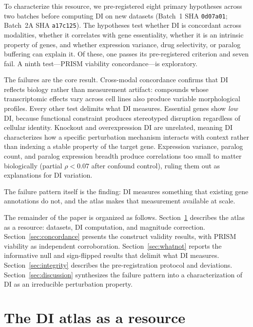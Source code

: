 \documentclass[11pt]{article}
\begin{document}
To characterize this resource, we pre-registered eight primary
hypotheses across two batches before computing DI on new datasets
(Batch~1 SHA \texttt{0d07a01}; Batch~2A SHA \texttt{a17c125}).  The
hypotheses test whether DI is concordant across modalities,
whether it correlates with gene essentiality, whether it is an
intrinsic property of genes, and whether expression variance,
drug selectivity, or paralog buffering can explain it.
Of these, one passes its pre-registered criterion and seven fail.  A
ninth test---PRISM viability concordance---is exploratory.

The failures are the core result.  Cross-modal concordance confirms
that DI reflects biology rather than measurement artifact: compounds
whose transcriptomic effects vary across cell lines also produce
variable morphological profiles.  Every other test delimits what DI
measures.  Essential genes show \emph{low} DI, because functional
constraint produces stereotyped disruption regardless of cellular
identity.  Knockout and overexpression DI are unrelated, meaning DI
characterizes how a specific perturbation mechanism interacts with
context rather than indexing a stable property of the target gene.
Expression variance, paralog count, and paralog expression breadth
produce correlations too small to matter biologically (partial
$\rho < 0.07$ after confound control), ruling them out as explanations
for DI variation.

The failure pattern itself is the finding: DI measures something that
existing gene annotations do not, and the atlas makes that measurement
available at scale.

The remainder of the paper is organized as follows.
Section~\ref{sec:atlas} describes the atlas as a resource: datasets,
DI computation, and magnitude correction.
Section~\ref{sec:concordance} presents the construct validity results,
with PRISM viability as independent corroboration.
Section~\ref{sec:whatnot} reports the informative null and sign-flipped
results that delimit what DI measures.
Section~\ref{sec:integrity} describes the pre-registration protocol and
deviations.
Section~\ref{sec:discussion} synthesizes the failure pattern into a
characterization of DI as an irreducible perturbation property.


\section{The DI atlas as a resource}
\label{sec:atlas}
\end{document}
